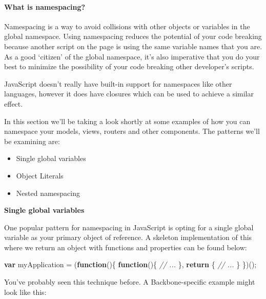 \documentclass[9pt]{book}
\newenvironment{Shaded}{}{}
\newcommand{\KeywordTok}[1]{\textcolor[rgb]{0.00,0.44,0.13}{\textbf{{#1}}}}
\newcommand{\CommentTok}[1]{\textcolor[rgb]{0.38,0.63,0.69}{\textit{{#1}}}}
\newcommand{\NormalTok}[1]{{#1}}
\begin{document}
\paragraph{What is namespacing?}\label{what-is-namespacing}

Namespacing is a way to avoid collisions with other objects or variables
in the global namespace. Using namespacing reduces the potential of your
code breaking because another script on the page is using the same
variable names that you are. As a good `citizen' of the global
namespace, it's also imperative that you do your best to minimize the
possibility of your code breaking other developer's scripts.

JavaScript doesn't really have built-in support for namespaces like
other languages, however it does have closures which can be used to
achieve a similar effect.

In this section we'll be taking a look shortly at some examples of how
you can namespace your models, views, routers and other components. The
patterns we'll be examining are:

\begin{itemize}
\itemsep1pt\parskip0pt
\item
  Single global variables
\item
  Object Literals
\item
  Nested namespacing
\end{itemize}

\textbf{Single global variables}

One popular pattern for namespacing in JavaScript is opting for a single
global variable as your primary object of reference. A skeleton
implementation of this where we return an object with functions and
properties can be found below:

\begin{Shaded}
\begin{Highlighting}[]
\KeywordTok{var} \NormalTok{myApplication = (}\KeywordTok{function}\NormalTok{()\{}
    \KeywordTok{function}\NormalTok{()\{}
      \CommentTok{// ...}
    \NormalTok{\},}
    \KeywordTok{return} \NormalTok{\{}
      \CommentTok{// ...}
    \NormalTok{\}}
\NormalTok{\})();}
\end{Highlighting}
\end{Shaded}

You've probably seen this technique before. A Backbone-specific example
might look like this:
\end{document}
